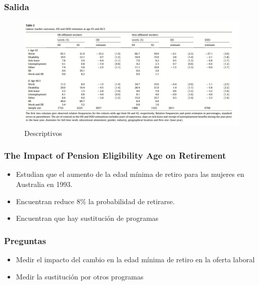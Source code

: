 \documentclass{beamer}
\begin{document}
    \frame
    {
    \frametitle{Salida}
    
    \begin{figure}[htp]
      \centering
      \includegraphics[width=14cm]{imgs/vestad-tbl2}
      \caption{Descriptivos}
      \label{fig:fig2}
    \end{figure}
    }
\frame
    {
      \frametitle{The Impact of Pension Eligibility Age on Retirement }
      \begin{itemize}
      \item Estudian  que el aumento de la edad mínima de retiro para las mujeres en Australia en 1993.
      \item Encuentran reduce 8\% la probabilidad de retirarse.
      \item Encuentran que hay sustitución de programas
      \end{itemize}
    }
    \frame
        {
          \frametitle{Preguntas}

          \begin{itemize}
          \item Medir el impacto del cambio en la edad mínima de retiro en la oferta laboral
          \item Medir la sustitución por otros programas
          \end{itemize}

          }
\end{document}
